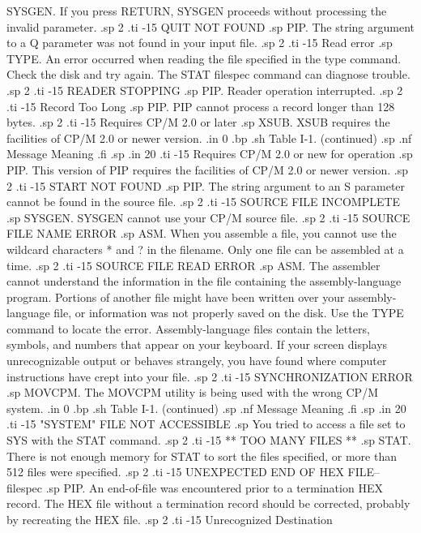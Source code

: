 SYSGEN.  If you press RETURN, SYSGEN proceeds without processing 
the invalid parameter.
.sp 2
.ti -15
QUIT NOT FOUND
.sp
PIP.  The string argument to a Q parameter was not found in your 
input file.
.sp 2
.ti -15
Read error
.sp
TYPE.  An error occurred when reading the file specified in the 
type command.  Check the disk and try again.  The STAT filespec 
command can diagnose trouble.
.sp 2
.ti -15
READER STOPPING
.sp
PIP.  Reader operation interrupted.
.sp 2
.ti -15
Record Too Long
.sp
PIP.  PIP cannot process a record longer than 128 bytes.
.sp 2
.ti -15
Requires CP/M 2.0 or later
.sp
XSUB.  XSUB requires the facilities of CP/M 2.0 or newer version.
.in 0
.bp
.sh
                     Table I-1.  (continued)
.sp
.nf
     Message        Meaning
.fi
.sp
.in 20
.ti -15
Requires CP/M 2.0 or new for operation
.sp
PIP.  This version of PIP requires the facilities of CP/M 2.0 or 
newer version.
.sp 2
.ti -15
START NOT FOUND
.sp
PIP.  The string argument to an S parameter cannot be found in 
the source file.
.sp 2
.ti -15
SOURCE FILE INCOMPLETE
.sp
SYSGEN.  SYSGEN cannot use your CP/M source file.
.sp 2
.ti -15
SOURCE FILE NAME ERROR
.sp
ASM.  When you assemble a file, you cannot use the wildcard 
characters * and ? in the filename. Only one file can be 
assembled at a time.
.sp 2
.ti -15
SOURCE FILE READ ERROR
.sp
ASM.  The assembler cannot understand the information in the file 
containing the assembly-language program.  Portions of another 
file might have been written over your assembly-language file, or 
information was not properly saved on the disk.  Use the TYPE 
command to locate the error.  Assembly-language files contain the 
letters, symbols, and numbers that appear on your keyboard.  If 
your screen displays unrecognizable output or behaves strangely, 
you have found where computer instructions have crept into your 
file.
.sp 2
.ti -15
SYNCHRONIZATION ERROR
.sp
MOVCPM.  The MOVCPM utility is being used with the wrong CP/M 
system.
.in 0
.bp
.sh
                     Table I-1.  (continued)
.sp
.nf
     Message        Meaning
.fi
.sp
.in 20
.ti -15
"SYSTEM" FILE NOT ACCESSIBLE
.sp
You tried to access a file set to SYS with the STAT command.
.sp 2
.ti -15
** TOO MANY FILES **
.sp
STAT.  There is not enough memory for STAT to sort the files 
specified, or more than 512 files were specified.
.sp 2
.ti -15
UNEXPECTED END OF HEX FILE--{filespec}
.sp
PIP.  An end-of-file was encountered prior to a termination HEX 
record.  The HEX file without a termination record should be 
corrected, probably by recreating the HEX file.
.sp 2
.ti -15
Unrecognized Destination
